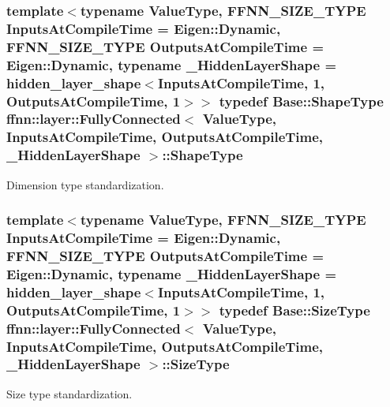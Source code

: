 \hypertarget{classffnn_1_1layer_1_1_fully_connected_a938c80efb16baa531fb424626f339333}{
\subsubsection[{Shape\-Type}]{\setlength{\rightskip}{0pt plus 5cm}template$<$typename Value\-Type, F\-F\-N\-N\-\_\-\-S\-I\-Z\-E\-\_\-\-T\-Y\-P\-E Inputs\-At\-Compile\-Time = Eigen\-::\-Dynamic, F\-F\-N\-N\-\_\-\-S\-I\-Z\-E\-\_\-\-T\-Y\-P\-E Outputs\-At\-Compile\-Time = Eigen\-::\-Dynamic, typename \-\_\-\-Hidden\-Layer\-Shape = hidden\-\_\-layer\-\_\-shape$<$\-Inputs\-At\-Compile\-Time, 1, Outputs\-At\-Compile\-Time, 1$>$$>$ typedef {\bf Base\-::\-Shape\-Type} {\bf ffnn\-::layer\-::\-Fully\-Connected}$<$ Value\-Type, Inputs\-At\-Compile\-Time, Outputs\-At\-Compile\-Time, \-\_\-\-Hidden\-Layer\-Shape $>$\-::{\bf Shape\-Type}}}\label{classffnn_1_1layer_1_1_fully_connected_a938c80efb16baa531fb424626f339333}


Dimension type standardization. 

\hypertarget{classffnn_1_1layer_1_1_fully_connected_a2924c85b3cc3e79db3f271cd22cac32c}{
\subsubsection[{Size\-Type}]{\setlength{\rightskip}{0pt plus 5cm}template$<$typename Value\-Type, F\-F\-N\-N\-\_\-\-S\-I\-Z\-E\-\_\-\-T\-Y\-P\-E Inputs\-At\-Compile\-Time = Eigen\-::\-Dynamic, F\-F\-N\-N\-\_\-\-S\-I\-Z\-E\-\_\-\-T\-Y\-P\-E Outputs\-At\-Compile\-Time = Eigen\-::\-Dynamic, typename \-\_\-\-Hidden\-Layer\-Shape = hidden\-\_\-layer\-\_\-shape$<$\-Inputs\-At\-Compile\-Time, 1, Outputs\-At\-Compile\-Time, 1$>$$>$ typedef Base\-::\-Size\-Type {\bf ffnn\-::layer\-::\-Fully\-Connected}$<$ Value\-Type, Inputs\-At\-Compile\-Time, Outputs\-At\-Compile\-Time, \-\_\-\-Hidden\-Layer\-Shape $>$\-::{\bf Size\-Type}}}\label{classffnn_1_1layer_1_1_fully_connected_a2924c85b3cc3e79db3f271cd22cac32c}


Size type standardization. 

